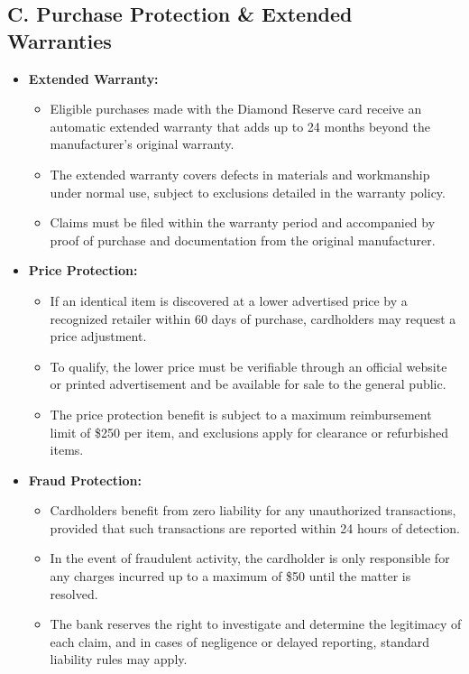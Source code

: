 \documentclass[12pt,a4paper]{article}
\begin{document}
\subsection*{C. Purchase Protection \& Extended Warranties}
\begin{itemize}
    \item \textbf{Extended Warranty:} 
    \begin{itemize}
        \item Eligible purchases made with the Diamond Reserve card receive an automatic extended warranty that adds up to 24 months beyond the manufacturer’s original warranty.
        \item The extended warranty covers defects in materials and workmanship under normal use, subject to exclusions detailed in the warranty policy.
        \item Claims must be filed within the warranty period and accompanied by proof of purchase and documentation from the original manufacturer.
    \end{itemize}
    
    \item \textbf{Price Protection:} 
    \begin{itemize}
        \item If an identical item is discovered at a lower advertised price by a recognized retailer within 60 days of purchase, cardholders may request a price adjustment.
        \item To qualify, the lower price must be verifiable through an official website or printed advertisement and be available for sale to the general public.
        \item The price protection benefit is subject to a maximum reimbursement limit of \$250 per item, and exclusions apply for clearance or refurbished items.
    \end{itemize}
    
    \item \textbf{Fraud Protection:} 
    \begin{itemize}
        \item Cardholders benefit from zero liability for any unauthorized transactions, provided that such transactions are reported within 24 hours of detection.
        \item In the event of fraudulent activity, the cardholder is only responsible for any charges incurred up to a maximum of \$50 until the matter is resolved.
        \item The bank reserves the right to investigate and determine the legitimacy of each claim, and in cases of negligence or delayed reporting, standard liability rules may apply.
    \end{itemize}
\end{itemize}
\end{document}
